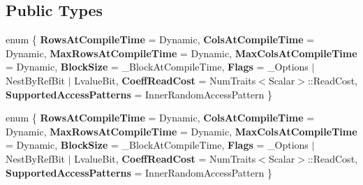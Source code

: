 \subsection*{Public Types}
\begin{DoxyCompactItemize}
\item 
\mbox{\label{struct_eigen_1_1internal_1_1traits_3_01_block_sparse_matrix_3_01___scalar_00_01___block_at_compibd5ca3edcdbc62bf01222bcf3326c5bd_a35a03593e0468fbbcb5e183dca87b079}} 
enum \{ \newline
{\bfseries Rows\+At\+Compile\+Time} = Dynamic, 
{\bfseries Cols\+At\+Compile\+Time} = Dynamic, 
{\bfseries Max\+Rows\+At\+Compile\+Time} = Dynamic, 
{\bfseries Max\+Cols\+At\+Compile\+Time} = Dynamic, 
\newline
{\bfseries Block\+Size} = \+\_\+\+Block\+At\+Compile\+Time, 
{\bfseries Flags} = \+\_\+\+Options $\vert$ Nest\+By\+Ref\+Bit $\vert$ Lvalue\+Bit, 
{\bfseries Coeff\+Read\+Cost} = Num\+Traits$<$Scalar$>$\+:\+:Read\+Cost, 
{\bfseries Supported\+Access\+Patterns} = Inner\+Random\+Access\+Pattern
 \}
\item 
\mbox{\label{struct_eigen_1_1internal_1_1traits_3_01_block_sparse_matrix_3_01___scalar_00_01___block_at_compibd5ca3edcdbc62bf01222bcf3326c5bd_a22bbe466bae15285323b246965c0af6a}} 
enum \{ \newline
{\bfseries Rows\+At\+Compile\+Time} = Dynamic, 
{\bfseries Cols\+At\+Compile\+Time} = Dynamic, 
{\bfseries Max\+Rows\+At\+Compile\+Time} = Dynamic, 
{\bfseries Max\+Cols\+At\+Compile\+Time} = Dynamic, 
\newline
{\bfseries Block\+Size} = \+\_\+\+Block\+At\+Compile\+Time, 
{\bfseries Flags} = \+\_\+\+Options $\vert$ Nest\+By\+Ref\+Bit $\vert$ Lvalue\+Bit, 
{\bfseries Coeff\+Read\+Cost} = Num\+Traits$<$Scalar$>$\+:\+:Read\+Cost, 
{\bfseries Supported\+Access\+Patterns} = Inner\+Random\+Access\+Pattern
 \}
\item 
\mbox{\label{struct_eigen_1_1internal_1_1traits_3_01_block_sparse_matrix_3_01___scalar_00_01___block_at_compibd5ca3edcdbc62bf01222bcf3326c5bd_a5a7f49b0301275a328580917dd12f1e4}} 

\end{DoxyCompactItemize}
